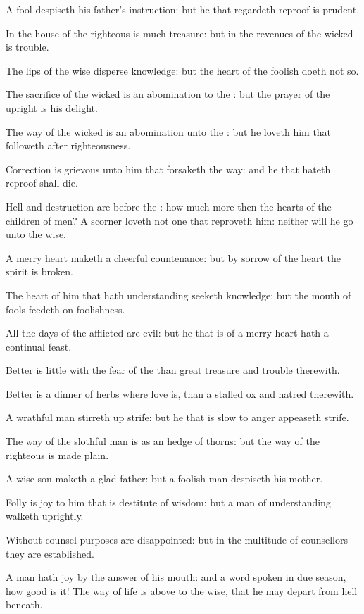 \verse A fool despiseth his father's instruction: but he that regardeth reproof is prudent.

\verse In the house of the righteous is much treasure: but in the revenues of the wicked is trouble.

\verse The lips of the wise disperse knowledge: but the heart of the foolish doeth not so.

\verse The sacrifice of the wicked is an abomination to the \LORD: but the prayer of the upright is his delight.

\verse The way of the wicked is an abomination unto the \LORD: but he loveth him that followeth after righteousness.

\verse Correction is grievous unto him that forsaketh the way: and he that hateth reproof shall die.

\verse Hell and destruction are before the \LORD: how much more then the hearts of the children of men?  \verse A scorner loveth not one that reproveth him: neither will he go unto the wise.

\verse A merry heart maketh a cheerful countenance: but by sorrow of the heart the spirit is broken.

\verse The heart of him that hath understanding seeketh knowledge: but the mouth of fools feedeth on foolishness.

\verse All the days of the afflicted are evil: but he that is of a merry heart hath a continual feast.

\verse Better is little with the fear of the \LORD than great treasure and trouble therewith.

\verse Better is a dinner of herbs where love is, than a stalled ox and hatred therewith.

\verse A wrathful man stirreth up strife: but he that is slow to anger appeaseth strife.

\verse The way of the slothful man is as an hedge of thorns: but the way of the righteous is made plain.

\verse A wise son maketh a glad father: but a foolish man despiseth his mother.

\verse Folly is joy to him that is destitute of wisdom: but a man of understanding walketh uprightly.

\verse Without counsel purposes are disappointed: but in the multitude of counsellors they are established.

\verse A man hath joy by the answer of his mouth: and a word spoken in due season, how good is it!  \verse The way of life is above to the wise, that he may depart from hell beneath.

